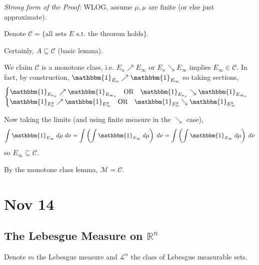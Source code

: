 \documentclass[12pt]{report}
\newcommand{\R}{\mathbb{R}}
\newcommand{\ind}{\mathbbm{1}}
\newcommand{\Cc}{\mathcal{C}}
\newcommand{\M}{\mathcal{M}}
\renewcommand{\L}{\mathcal{L}}
\newcommand{\sub}{\subseteq}
\newenvironment*{tbox}[2][gray]{
    \begin{tcolorbox}[
        parbox=false,
        colback=#1!5!white,
        colframe=#1!75!black,
        breakable,
        title={#2}
    ]}
    {\end{tcolorbox}}
\begin{document}
    \begin{tbox}{\textbf{Tonelli Theorem}: 
        \[\int \ind_E \; d\mu \; d\nu = \int \left(\int \ind_E \; d\mu\right) \; d\nu = \int \left(\int \ind_E \; d\mu\right) \; d\nu\]}
        \emph{Strong form of the Proof:} WLOG, assume $\mu, \mu$ are finite (or else just approximate). 
        
        Denote $\Cc = \{\text{all sets } E \text{ s.t. the theorem holds}\}$.

        Certainly, $A \sub \Cc$ (basic lemma). 

        We claim $\Cc$ is a monotone class, i.e. $E_n \nearrow E_{\infty}$ or $E_n \searrow E_{\infty}$ implies $E_{\infty} \in \Cc$. In fact, by construction, $\ind_{E_n} \nearrow \ind_{E_{\infty}}$ so taking sections, 
        \[\begin{cases}
            \ind_{E_{n_x}} \nearrow \ind_{E_{\infty_x}} \quad \text{OR} \quad \ind_{E_{n_x}} \searrow \ind_{E_{\infty_x}}\\ 
            \ind_{E_{n}^y} \nearrow \ind_{E_{\infty}^y} \quad \text{OR} \quad \ind_{E_n^y} \searrow \ind_{E_{\infty}^y}
        \end{cases}\]
        
        Now taking the limits (and using finite measure in the $\searrow$ case), 
        \[\int \ind_{E_{\infty}} \; d\mu \; d\nu = \int \left(\int \ind_{E_{\infty}} \; d\mu\right) \; d\nu = \int \left(\int \ind_{E_{\infty}} \; d\mu\right) \; d\nu\] 
        so $E_{\infty} \sub \Cc$. 

        By the monotone class lemma, $\M = \Cc$. 

    \end{tbox}

\section{Nov 14}
\subsection*{The Lebesgue Measure on $\R^n$}
    Denote $m$ the Lebesgue measure and $\L^n$ the class of Lebesgue measurable sets.
\end{document}
